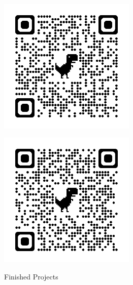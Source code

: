 \documentclass[letterpaper,10pt]{article}
\begin{document}
\begin{center}
    \begin{minipage}{0.45\textwidth}
        \centering
        \includegraphics[width=6.5cm, height=6.5cm]{Figures/STM32.png}
        \label{fig:image3}
    \end{minipage}
    \hspace{0.05\textwidth}
    \begin{minipage}{0.45\textwidth}
        \centering
        \includegraphics[width=6.5cm, height=6.5cm]{Figures/CustomCane.png}
        \label{fig:image4}
    \end{minipage}
    Finished Projects
    \vspace{0.5cm} %


\end{center}
\end{document}
